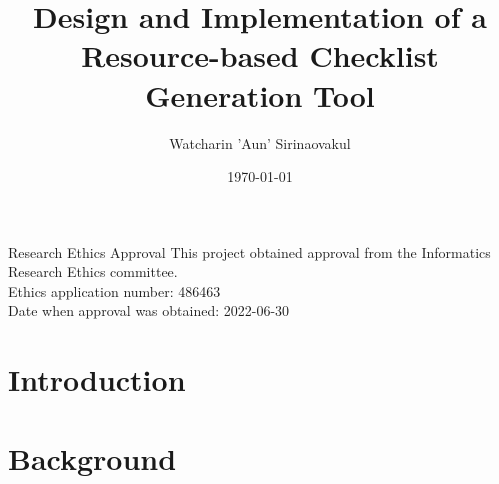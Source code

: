 \documentclass[logo,msc,cs]{infthesis}      %
\begin{document}
\begin{preliminary}

\title{Design and Implementation of a Resource-based Checklist Generation Tool}

\author{Watcharin 'Aun' Sirinaovakul}

\date{\today}

\abstract{

}

\maketitle

\newenvironment{ethics}
   {\begin{frontenv}{Research Ethics Approval}{\LARGE}}
   {\end{frontenv}\newpage}

\begin{ethics}
This project obtained approval from the Informatics Research Ethics committee.\\
Ethics application number: 486463\\
Date when approval was obtained: 2022-06-30

\standarddeclaration
\end{ethics}


\begin{acknowledgements}

\end{acknowledgements}


\tableofcontents
\end{preliminary}


\chapter{Introduction}



\chapter{Background}



% 
\end{document}
